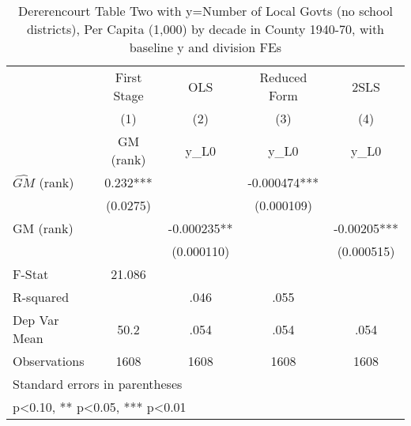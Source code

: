 \begin{table}[htbp]\centering
\def\sym#1{\ifmmode^{#1}\else\(^{#1}\)\fi}
\caption{Dererencourt Table Two with y=Number of Local Govts (no school districts), Per Capita (1,000) by decade in County 1940-70, with baseline y and division FEs}
\begin{tabular}{l*{4}{c}}
\toprule
                    & First Stage   &         OLS   &Reduced Form   &        2SLS   \\
                    &\multicolumn{1}{c}{(1)}&\multicolumn{1}{c}{(2)}&\multicolumn{1}{c}{(3)}&\multicolumn{1}{c}{(4)}\\
                    &\multicolumn{1}{c}{GM  (rank)}&\multicolumn{1}{c}{y\_L0}&\multicolumn{1}{c}{y\_L0}&\multicolumn{1}{c}{y\_L0}\\
\midrule
$\hat{GM}$ (rank)   &       0.232***&               &   -0.000474***&               \\
                    &    (0.0275)   &               &  (0.000109)   &               \\
\addlinespace
GM  (rank)          &               &   -0.000235** &               &    -0.00205***\\
                    &               &  (0.000110)   &               &  (0.000515)   \\
\midrule
F-Stat              &      21.086   &               &               &               \\
R-squared           &               &        .046   &        .055   &               \\
Dep Var Mean        &        50.2   &        .054   &        .054   &        .054   \\
Observations        &        1608   &        1608   &        1608   &        1608   \\
\bottomrule
\multicolumn{5}{l}{\footnotesize Standard errors in parentheses}\\
\multicolumn{5}{l}{\footnotesize * p<0.10, ** p<0.05, *** p<0.01}\\
\end{tabular}
\end{table}
